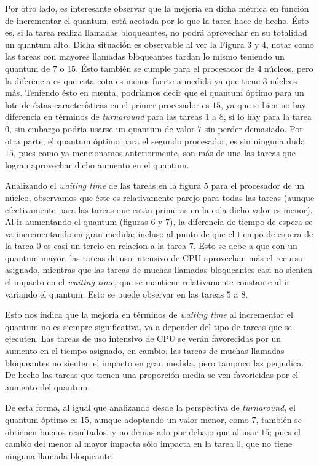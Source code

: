 \documentclass[a4paper]{article}
\begin{document}
Por otro lado, es interesante observar que la mejoría en dicha métrica en
función de incrementar el quantum, está acotada por lo que la tarea hace de
hecho. Ésto es, si la tarea realiza llamadas bloqueantes, no podrá
aprovechar en su totalidad un quantum alto. Dicha situación es observable al
ver la Figura 3 y 4, notar como las tareas con mayores llamadas bloqueantes
tardan lo mismo teniendo un quantum de $7$ o $15$. Ésto también se cumple
para el procesador de 4 núcleos, pero la diferencia es que esta cota es
menos fuerte a medida ya que tiene 3 núcleos más.
Teniendo ésto en cuenta, podríamos decir que el quantum óptimo para un
lote de éstas características en el primer procesador es $15$, ya que si bien 
no hay diferencia en términos de \textit{turnaround} para las tareas
$1$ a $8$, sí lo hay para la tarea $0$, sin embargo podría usarse un quantum de valor
$7$ sin perder demasiado.
Por otra parte, el quantum óptimo para el segundo procesador, es sin ninguna
duda $15$, pues como ya mencionamos anteriormente, son más de una las tareas
que logran aprovechar dicho aumento en el quantum.

Analizando el \textit{waiting time} de las tareas en la figura 5 para el
procesador de un núcleo, observamos que éste es relativamente parejo para
todas las tareas (aunque efectivamente para las tareas que están primeras
en la cola dicho valor es menor). Al ir aumentando el quantum (figuras 6 y 7),
la diferencia de tiempo de espera se va incrementando
en gran medida; incluso al punto de que el tiempo de espera de la tarea
$0$ es casi un tercio en relacion a la tarea $7$. Esto se debe a que con un
quantum mayor, las tareas de uso intensivo de CPU aprovechan más el recurso
asignado, mientras que las tareas de muchas llamadas bloqueantes casi no
sienten el impacto en el \textit{waiting time}, que se mantiene relativamente
constante al ir variando el quantum. Esto se puede observar en las tareas
$5$ a $8$.

Esto nos indica que la mejoría en términos de \textit{waiting time} al
incrementar el quantum no es siempre significativa, va a depender del tipo
de tareas que se ejecuten. Las tareas de uso intensivo de CPU se verán
favorecidas por un aumento en el tiempo asignado, en cambio, las tareas de
muchas llamadas bloqueantes no sienten el impacto en gran medida, pero
tampoco las perjudica. De hecho las tareas que tienen una proporción media
se ven favoricidas por el aumento del quantum.

De esta forma, al igual que analizando desde la perspectiva de
\textit{turnaround},  el quantum óptimo es $15$, aunque adoptando un valor
menor, como $7$, también se obtienen buenos resultados, y no demasiado por
debajo que al usar $15$; pues el cambio del menor al mayor impacta sólo
impacta en la tarea $0$, que no tiene ninguna llamada bloqueante.
\end{document}
